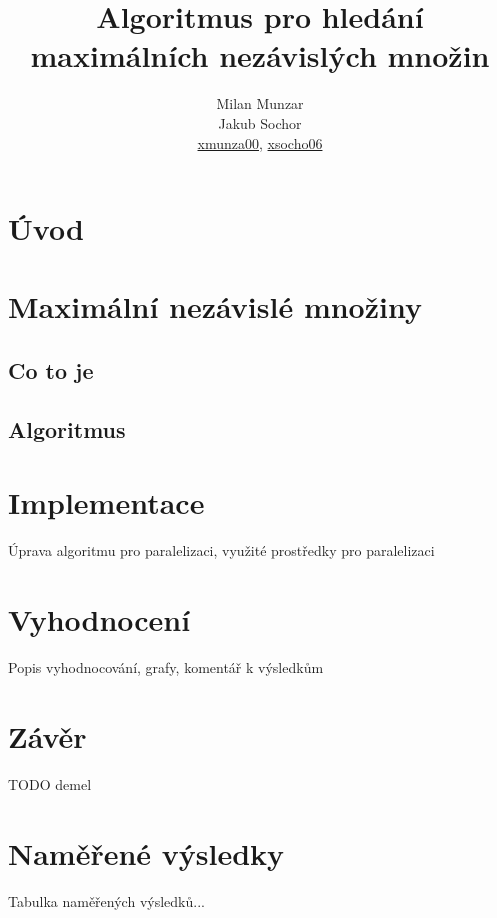 \documentclass[12pt]{article}
\title{Algoritmus pro hledání maximálních nezávislých množin}
\author{Milan Munzar\\
Jakub Sochor\\
\normalsize{\url{xmunza00}, \url{xsocho06} }}
\date{}
\begin{document}
\maketitle

\section{Úvod}

\section{Maximální nezávislé množiny}
\subsection{Co to je}
\subsection{Algoritmus}


\section{Implementace}
Úprava algoritmu pro paralelizaci, využité prostředky pro paralelizaci


\section{Vyhodnocení}
Popis vyhodnocování, grafy, komentář k výsledkům

\section{Závěr}

\begin{thebibliography}{99}
 TODO demel
\end{thebibliography}

\appendix
\section{Naměřené výsledky}
Tabulka naměřených výsledků...
\end{document}
